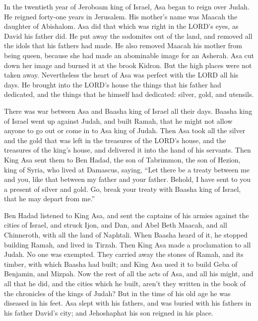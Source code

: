 \myverse{}In the twentieth year of Jeroboam king of Israel, Asa began to
reign over Judah.
\myverse{}He reigned forty-one years in Jerusalem. His mother’s name was Maacah the
daughter of Abishalom.
\myverse{}Asa did that which was right in the LORD’s eyes, as David his father did.
\myverse{}He put away the sodomites out of the land, and removed all the idols that
his fathers had made.
\myverse{}He also removed Maacah his mother from being queen, because she had made
an abominable image for an Asherah. Asa cut down her image and burned it at the brook Kidron.
\myverse{}But the high places were not taken away. Nevertheless the heart of Asa was
perfect with the LORD all his days.
\myverse{}He brought into the LORD’s house the things that his father had dedicated,
and the things that he himself had dedicated: silver, gold, and utensils.

\myverse{}There was war between Asa and Baasha king of Israel all their
days.
\myverse{}Baasha king of Israel went up against Judah, and built Ramah, that he might
not allow anyone to go out or come in to Asa king of Judah.
\myverse{}Then Asa took all the silver and the gold that was left in the treasures
of the LORD’s house, and the treasures of the king’s house, and delivered it into the hand of his servants.
Then King Asa sent them to Ben Hadad, the son of Tabrimmon, the son of Hezion, king of Syria, who lived
at Damascus, saying,
\myverse{}“Let there be a treaty between me and you, like that between my father and
your father. Behold, I have sent to you a present of silver and gold. Go, break your treaty with Baasha
king of Israel, that he may depart from me.”

\myverse{}Ben Hadad listened to King Asa, and sent the captains of his
armies against the cities of Israel, and struck Ijon, and Dan, and Abel Beth Maacah, and all Chinneroth,
with all the land of Naphtali.
\myverse{}When Baasha heard of it, he stopped building Ramah, and lived in Tirzah.
\myverse{}Then King Asa made a proclamation to all Judah. No one was exempted. They
carried away the stones of Ramah, and its timber, with which Baasha had built; and King Asa used it to
build Geba of Benjamin, and Mizpah.
\myverse{}Now the rest of all the acts of Asa, and all his might, and all that he did,
and the cities which he built, aren’t they written in the book of the chronicles of the kings of Judah?
But in the time of his old age he was diseased in his feet.
\myverse{}Asa slept with his fathers, and was buried with his fathers in his father
David’s city; and Jehoshaphat his son reigned in his place.

